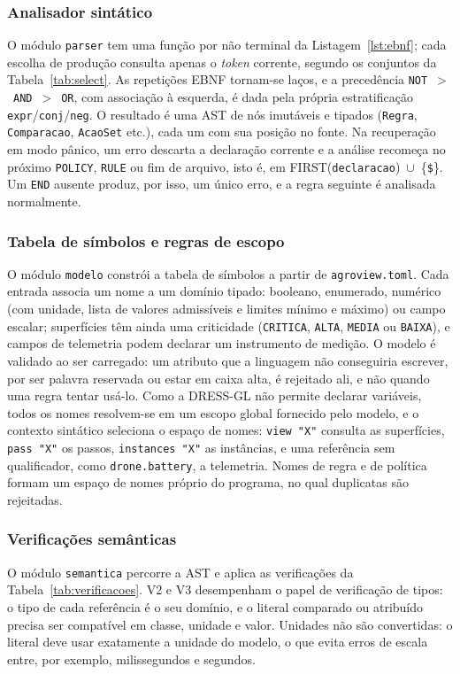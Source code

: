 \documentclass[conference]{IEEEtran}
\begin{document}
\subsubsection{Analisador sintático}
\label{sec:parser}
O módulo \texttt{parser} tem uma função por não terminal da
Listagem~\ref{lst:ebnf}; cada escolha de produção consulta apenas o
\textit{token} corrente, segundo os conjuntos da Tabela~\ref{tab:select}. As
repetições EBNF tornam-se laços, e a precedência
\texttt{NOT}~$>$~\texttt{AND}~$>$~\texttt{OR}, com associação à esquerda, é
dada pela própria estratificação \texttt{expr}/\texttt{conj}/\texttt{neg}. O
resultado é uma AST de nós imutáveis e tipados (\texttt{Regra},
\texttt{Comparacao}, \texttt{AcaoSet} etc.), cada um com sua posição no fonte.
Na recuperação em modo pânico, um erro descarta a declaração corrente e a
análise recomeça no próximo \texttt{POLICY}, \texttt{RULE} ou fim de arquivo,
isto é, em FIRST(\texttt{declaracao})~$\cup$~\{\texttt{\$}\}. Um
\texttt{END} ausente produz, por isso, um único erro, e a regra seguinte é
analisada normalmente.

\subsubsection{Tabela de símbolos e regras de escopo}
\label{sec:tabsimb}
O módulo \texttt{modelo} constrói a tabela de símbolos a partir de
\texttt{agroview.toml}. Cada entrada associa um nome a um domínio tipado:
booleano, enumerado, numérico (com unidade, lista de valores admissíveis e
limites mínimo e máximo) ou campo escalar; superfícies têm ainda uma
criticidade (\texttt{CRITICA}, \texttt{ALTA}, \texttt{MEDIA} ou
\texttt{BAIXA}), e campos de telemetria podem declarar um instrumento de
medição. O modelo é validado ao ser carregado: um atributo que a linguagem não
conseguiria escrever, por ser palavra reservada ou estar em caixa alta, é
rejeitado ali, e não quando uma regra tentar usá-lo. Como a DRESS-GL não
permite declarar variáveis, todos os nomes resolvem-se em um escopo global
fornecido pelo modelo, e o contexto sintático seleciona o espaço de nomes:
\texttt{view "X"} consulta as superfícies, \texttt{pass "X"} os passos,
\texttt{instances "X"} as instâncias, e uma referência sem qualificador, como
\texttt{drone.battery}, a telemetria. Nomes de regra e de política formam um
espaço de nomes próprio do programa, no qual duplicatas são rejeitadas.

\subsubsection{Verificações semânticas}
\label{sec:verif}
O módulo \texttt{semantica} percorre a AST e aplica as verificações da
Tabela~\ref{tab:verificacoes}. V2 e V3 desempenham o papel de verificação de
tipos: o tipo de cada referência é o seu domínio, e o literal comparado ou
atribuído precisa ser compatível em classe, unidade e valor. Unidades não são
convertidas: o literal deve usar exatamente a unidade do modelo, o que evita
erros de escala entre, por exemplo, milissegundos e segundos.
\end{document}

